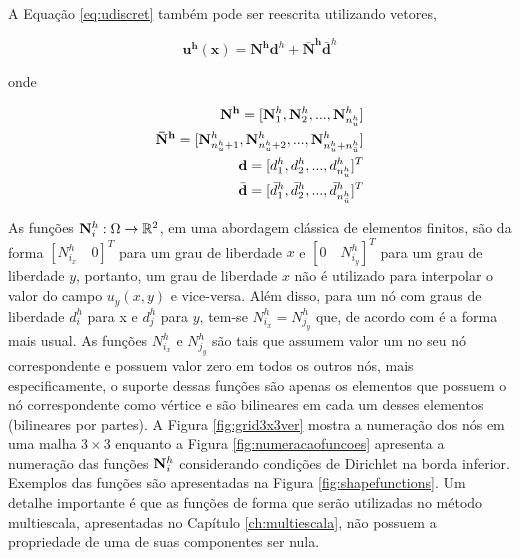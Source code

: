 A Equação \eqref{eq:udiscret} também pode ser reescrita utilizando vetores,

\begin{equation}\label{eq:udiscretvetor}
\mathbf{u^h}(\mathbf{x}) = \mathbf{N^h} \mathbf{d}^h + \mathbf{\bar{N}^h} \mathbf{\bar{d}}^h
\end{equation}

onde

\begin{eqnarray*}
\mathbf{N^h} = [\basefunctionfine[1], \basefunctionfine[2], ..., \basefunctionfine[\qtdfreedomfine] ] \\
\mathbf{\bar{N}^h}  =[\basefunctionfine[\qtdfreedomfine + 1], \basefunctionfine[\qtdfreedomfine + 2], ..., \basefunctionfine[\qtdfreedomfine + \qtdessentialfine]] \\
\mathbf{d} = [d_1^h, d_2^h, ... , d_{\qtdfreedomfine}^h]^T \\
\bar{\mathbf{d}} = [\bar{d}_1^h, \bar{d}_2^h, ... , \bar{d}_{\qtdessentialfine}^h]^T
\end{eqnarray*}


As funções $\basefunctionfine: \Omega \rightarrow \mathbb{R}^2$, em uma abordagem clássica de elementos finitos, são da forma $[N^h_{i_x} \quad 0]^T$ para um grau de liberdade $x$ e  $[0 \quad N^h_{i_y}]^T$  para um grau de liberdade $y$, portanto, um grau de liberdade $x$ não é utilizado para interpolar o valor do campo $u_y(x, y)$ e vice-versa. Além disso, para um nó com  graus de liberdade $d^h_i$ para x e $d^h_j$ para $y$, tem-se $N^h_{i_x} = N^h_{j_y}$ que, de acordo com \cite{jacob} é a forma mais usual. 
As funções $N^h_{i_x}$  e $N^h_{j_y}$ são tais que assumem valor um no seu nó correspondente e possuem valor zero em todos os outros nós, mais especificamente, o suporte dessas funções são apenas os elementos que possuem o nó correspondente como vértice e são bilineares em cada um desses elementos (bilineares por partes). A Figura \ref{fig:grid3x3ver} mostra a numeração dos nós em uma malha $3\times3$ enquanto a Figura \ref{fig:numeracaofuncoes} apresenta a numeração das funções $\basefunctionfine$ considerando condições de Dirichlet na borda inferior.
Exemplos das funções são apresentadas na Figura \ref{fig:shapefunctions}.
Um detalhe importante é que as funções de forma que serão utilizadas no método multiescala, apresentadas no Capítulo \ref{ch:multiescala}, não possuem a propriedade de uma de suas componentes ser nula.


